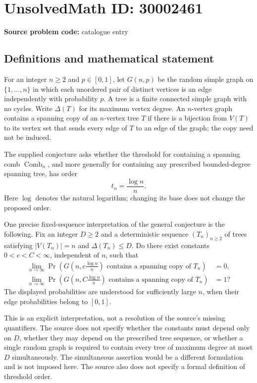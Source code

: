 \documentclass[11pt]{article}
\begin{document}
\section*{UnsolvedMath ID: 30002461}
\textbf{Source problem code:} catalogue entry
\subsection{Definitions and mathematical statement}
For an integer \(n\geq 2\) and \(p\in[0,1]\), let \(G(n,p)\) be the random simple graph on \(\{1,\ldots,n\}\) in which each unordered pair of distinct vertices is an edge independently with probability \(p\). A tree is a finite connected simple graph with no cycles. Write \(\Delta(T)\) for its maximum vertex degree. An \(n\)-vertex graph contains a spanning copy of an \(n\)-vertex tree \(T\) if there is a bijection from \(V(T)\) to its vertex set that sends every edge of \(T\) to an edge of the graph; the copy need not be induced.

The supplied conjecture asks whether the threshold for containing a spanning comb \(\operatorname{Comb}_n\), and more generally for containing any prescribed bounded-degree spanning tree, has order
\[
 t_n=\frac{\log n}{n}.
\]
Here \(\log\) denotes the natural logarithm; changing its base does not change the proposed order.

One precise fixed-sequence interpretation of the general conjecture is the following. Fix an integer \(D\geq 2\) and a deterministic sequence \((T_n)_{n\geq 2}\) of trees satisfying \(|V(T_n)|=n\) and \(\Delta(T_n)\leq D\). Do there exist constants \(0<c<C<\infty\), independent of \(n\), such that
\[
\begin{aligned}
\lim_{n\to\infty}\Pr\!\left(G\!\left(n,c\frac{\log n}{n}\right)\text{ contains a spanning copy of }T_n\right)&=0,\\
\lim_{n\to\infty}\Pr\!\left(G\!\left(n,C\frac{\log n}{n}\right)\text{ contains a spanning copy of }T_n\right)&=1?
\end{aligned}
\]
The displayed probabilities are understood for sufficiently large \(n\), when their edge probabilities belong to \([0,1]\).

This is an explicit interpretation, not a resolution of the source's missing quantifiers. The source does not specify whether the constants must depend only on \(D\), whether they may depend on the prescribed tree sequence, or whether a single random graph is required to contain every tree of maximum degree at most \(D\) simultaneously. The simultaneous assertion would be a different formulation and is not imposed here. The source also does not specify a formal definition of threshold order.
\end{document}

